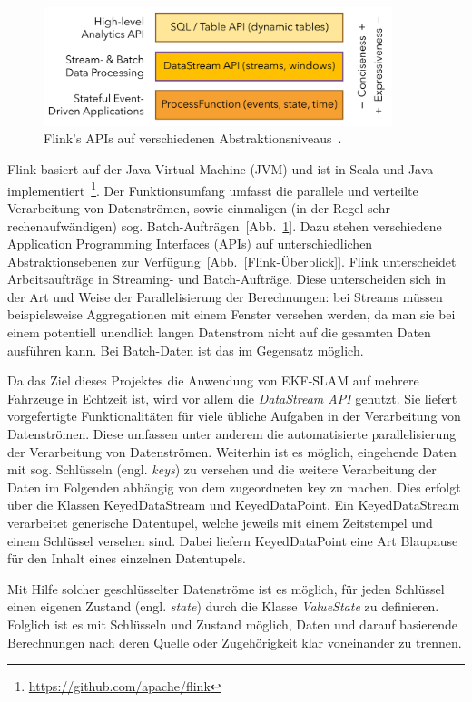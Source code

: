 \documentclass[11pt]{scrartcl}
\begin{document}
\begin{figure}[!t]
	\centering
	\includegraphics[width=4in]{Flink-api-stack.png}
	\caption{Flink's APIs auf verschiedenen Abstraktionsniveaus~\cite{Flink-APIs-Link}.}
	\label{Flink-APIs}
\end{figure}

Flink basiert auf der Java Virtual Machine (JVM) und ist in Scala und Java implementiert~\footnote{\url{https://github.com/apache/flink}}. Der Funktionsumfang umfasst die parallele und verteilte Verarbeitung von Datenströmen, sowie einmaligen (in der Regel sehr rechenaufwändigen) sog. Batch-Aufträgen~[Abb.~\ref{Flink-APIs}]. Dazu stehen verschiedene Application Programming Interfaces (APIs) auf unterschiedlichen Abstraktionsebenen zur Verfügung~[Abb.~\ref{Flink-Überblick}]. Flink unterscheidet Arbeitsaufträge in Streaming- und Batch-Auf\-trä\-ge. Diese unterscheiden sich in der Art und Weise der Parallelisierung der Berechnungen: bei Streams müssen beispielsweise Aggregationen mit einem Fenster versehen werden, da man sie bei einem potentiell unendlich langen Datenstrom nicht auf die gesamten Daten ausführen kann. Bei Batch-Daten ist das im Gegensatz möglich.

Da das Ziel dieses Projektes die Anwendung von EKF-SLAM auf mehrere Fahrzeuge in Echtzeit ist, wird vor allem die \textit{DataStream API} genutzt. Sie liefert vorgefertigte Funktionalitäten für viele übliche Aufgaben in der Verarbeitung von Datenströmen. Diese umfassen unter anderem die automatisierte parallelisierung der Verarbeitung von Datenströmen. Weiterhin ist es möglich, eingehende Daten mit sog. Schlüsseln (engl. \textit{keys}) zu versehen und die weitere Verarbeitung der Daten im Folgenden abhängig von dem zugeordneten key zu machen. Dies erfolgt über die Klassen KeyedDataStream und KeyedDataPoint. Ein KeyedDataStream verarbeitet generische Datentupel, welche jeweils mit einem Zeitstempel und einem Schlüssel versehen sind. Dabei liefern KeyedDataPoint eine Art Blaupause für den Inhalt eines einzelnen Datentupels.

Mit Hilfe solcher geschlüsselter Datenströme ist es möglich, für jeden Schlüssel einen eigenen Zustand (engl. \textit{state}) durch die Klasse \textit{ValueState} zu definieren. Folglich ist es mit Schlüsseln und Zustand möglich, Daten und darauf basierende Berechnungen nach deren Quelle oder Zugehörigkeit klar voneinander zu trennen.
\end{document}
